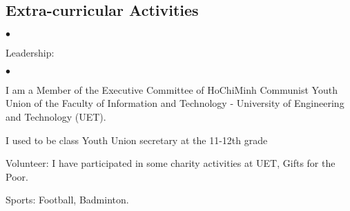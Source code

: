 \documentclass[margin,line]{res}
\newenvironment{list2}{
  \begin{list}{$\bullet$}{%
      \setlength{\itemsep}{0in}
      \setlength{\parsep}{0in} \setlength{\parskip}{0in}
      \setlength{\topsep}{0in} \setlength{\partopsep}{0in} 
      \setlength{\leftmargin}{0.2in}}}{\end{list}}
\begin{document}
\begin{resume}
\section{\sc Extra-curricular Activities}
\begin{list2}
\item Leadership: 
\begin{list2}
\item I am a Member of the Executive Committee of HoChiMinh Communist Youth Union of the Faculty of Information and Technology - University of Engineering and Technology (UET).
\vspace{1em}
\item I used to be class Youth Union secretary at the 11-12th grade
\vspace{1em}
\end{list2}
\item Volunteer: I have participated in some charity activities at UET, Gifts for the Poor.
\vspace{1em}
\item Sports: Football, Badminton.
\end{list2}
%

\end{resume}
\end{document}

